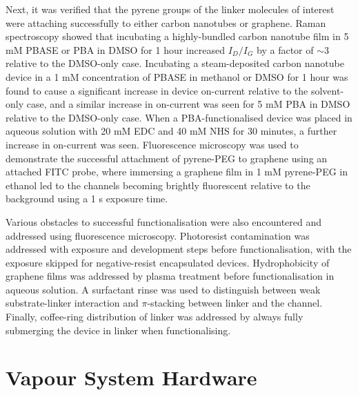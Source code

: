 \documentclass[
  a4paper,
]{scrbook}
\begin{document}
Next, it was verified that the pyrene groups of the linker molecules of
interest were attaching successfully to either carbon nanotubes or
graphene. Raman spectroscopy showed that incubating a highly-bundled
carbon nanotube film in 5 mM PBASE or PBA in DMSO for 1 hour increased
\(I_D/I_G\) by a factor of \(\sim 3\) relative to the DMSO-only case.
Incubating a steam-deposited carbon nanotube device in a 1 mM
concentration of PBASE in methanol or DMSO for 1 hour was found to cause
a significant increase in device on-current relative to the solvent-only
case, and a similar increase in on-current was seen for 5 mM PBA in DMSO
relative to the DMSO-only case. When a PBA-functionalised device was
placed in aqueous solution with 20 mM EDC and 40 mM NHS for 30 minutes,
a further increase in on-current was seen. Fluorescence microscopy was
used to demonstrate the successful attachment of pyrene-PEG to graphene
using an attached FITC probe, where immersing a graphene film in 1 mM
pyrene-PEG in ethanol led to the channels becoming brightly fluorescent
relative to the background using a 1 s exposure time.

Various obstacles to successful functionalisation were also encountered
and addressed using fluorescence microscopy. Photoresist contamination
was addressed with exposure and development steps before
functionalisation, with the exposure skipped for negative-resist
encapsulated devices. Hydrophobicity of graphene films was addressed by
plasma treatment before functionalisation in aqueous solution. A
surfactant rinse was used to distinguish between weak substrate-linker
interaction and \(\pi\)-stacking between linker and the channel.
Finally, coffee-ring distribution of linker was addressed by always
fully submerging the device in linker when functionalising.

\cleardoublepage
{}
{}
\appendix

\hypertarget{vapour-system-hardware}{%
\chapter{Vapour System Hardware}\label{vapour-system-hardware}}
\end{document}
